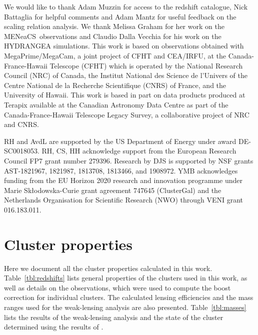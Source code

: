\documentclass[useAMS,usenatbib]{mnras}
\newcommand{\mn}{MENeaCS}
\begin{document}
We would like to thank Adam Muzzin for access to the redshift catalogue, Nick Battaglia for helpful comments and Adam Mantz for useful feedback on the scaling relation analysis.
We thank Melissa Graham for her work on the \mn \ observations and 
Claudio Dalla Vecchia for his work on the HYDRANGEA simulations.
This work is based on observations obtained with MegaPrime/MegaCam, a joint project of CFHT and CEA/IRFU, at the Canada-France-Hawaii Telescope (CFHT) which is operated by the National Research Council (NRC) of Canada, the Institut National des Science de l'Univers of the Centre National de la Recherche Scientifique (CNRS) of France, and the University of Hawaii. This work is based in part on data products produced at Terapix available at the Canadian Astronomy Data Centre as part of the Canada-France-Hawaii Telescope Legacy Survey, a collaborative project of NRC and CNRS. 

RH and AvdL are supported by the US Department of Energy under award DE-SC0018053. RH, CS, HH acknowledge support from the European Research Council FP7 grant number 279396. Research by DJS is supported by NSF grants AST-1821967, 1821987, 1813708, 1813466, and 1908972. 
YMB acknowledges funding from the EU Horizon 2020 research and innovation programme under Marie Sk{\l}odowska-Curie grant agreement 747645 (ClusterGal) and the Netherlands Organisation for Scientific Research (NWO) through VENI grant 016.183.011. 












\appendix



\section{Cluster properties}

Here we document all the cluster properties calculated in this work. Table~\ref{tbl:redshifts} lists general properties of the clusters used in this work, as well as details on the observations, which were used to compute the boost correction for individual clusters. The calculated lensing efficiencies and the mass ranges used for the weak-lensing analysis are also presented. Table~\ref{tbl:masses} lists the results of the weak-lensing analysis and the state of the cluster determined using the results of \citet{mantz15b}.
\end{document}
